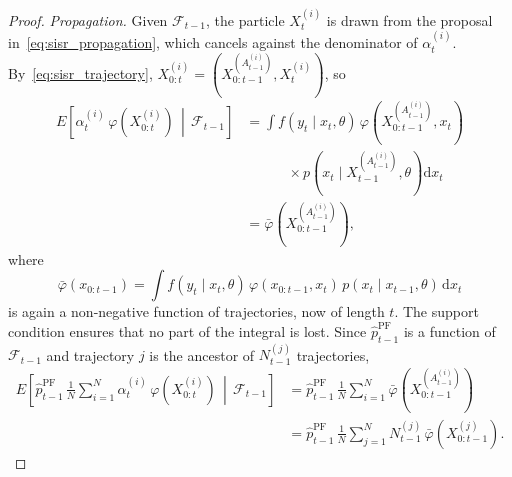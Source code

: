 \begin{proof}
    \emph{Propagation.} Given $\mathcal{F}_{t-1}$, the particle $X_t^{(i)}$ is drawn from the proposal in~\eqref{eq:sisr_propagation}, which cancels against the denominator of $\alpha_t^{(i)}$. By~\eqref{eq:sisr_trajectory}, $X_{0:t}^{(i)} = (X_{0:t-1}^{(A_{t-1}^{(i)})},X_t^{(i)})$, so
    \begin{align}
        E\left[\alpha_t^{(i)}\,\varphi(X_{0:t}^{(i)})\,\middle|\,\mathcal{F}_{t-1}\right] &= \int f(y_t\mid x_t,\theta)\,\varphi\left(X_{0:t-1}^{(A_{t-1}^{(i)})},x_t\right) \\
        &\qquad\quad \times p\left(x_t\mid X_{t-1}^{(A_{t-1}^{(i)})},\theta\right)\mathrm{d}x_t \\
        &= \bar{\varphi}\left(X_{0:t-1}^{(A_{t-1}^{(i)})}\right),
    \end{align}
    where
    \begin{equation}
        \bar{\varphi}(x_{0:t-1}) = \int f(y_t\mid x_t,\theta)\,\varphi(x_{0:t-1},x_t)\,p(x_t\mid x_{t-1},\theta)\,\mathrm{d}x_t
    \end{equation}
    is again a non-negative function of trajectories, now of length $t$. The support condition ensures that no part of the integral is lost. Since $\hat{p}^{\mathrm{PF}}_{t-1}$ is a function of $\mathcal{F}_{t-1}$ and trajectory $j$ is the ancestor of $N_{t-1}^{(j)}$ trajectories,
    \begin{align}
        E\left[\hat{p}^{\mathrm{PF}}_{t-1}\,\frac{1}{N}\sum_{i=1}^{N} \alpha_t^{(i)}\,\varphi(X_{0:t}^{(i)}) \,\middle|\, \mathcal{F}_{t-1}\right] &= \hat{p}^{\mathrm{PF}}_{t-1}\,\frac{1}{N}\sum_{i=1}^{N} \bar{\varphi}\left(X_{0:t-1}^{(A_{t-1}^{(i)})}\right) \\
        &= \hat{p}^{\mathrm{PF}}_{t-1}\,\frac{1}{N}\sum_{j=1}^{N} N_{t-1}^{(j)}\,\bar{\varphi}(X_{0:t-1}^{(j)}).
        \label{eq:pf_propagation_step}
    \end{align}


\end{proof}
